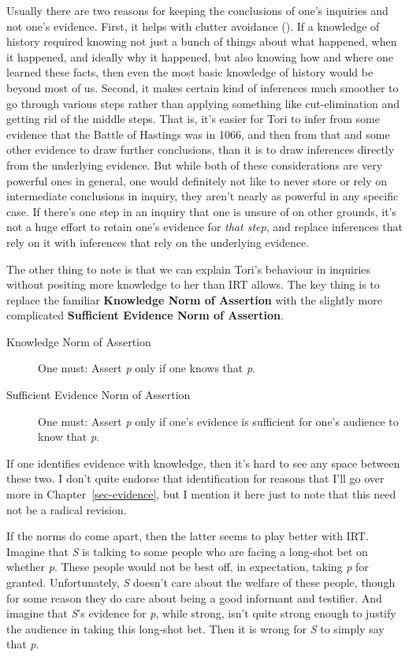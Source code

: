 \documentclass[
  12pt,
  letterpaper,
]{scrbook}
\begin{document}
Usually there are two reasons for keeping the conclusions of one's
inquiries and not one's evidence. First, it helps with clutter avoidance
(). If a knowledge of history
required knowing not just a bunch of things about what happened, when it
happened, and ideally why it happened, but also knowing how and where
one learned these facts, then even the most basic knowledge of history
would be beyond most of us. Second, it makes certain kind of inferences
much smoother to go through various steps rather than applying something
like cut-elimination and getting rid of the middle steps. That is, it's
easier for Tori to infer from some evidence that the Battle of Hastings
was in 1066, and then from that and some other evidence to draw further
conclusions, than it is to draw inferences directly from the underlying
evidence. But while both of these considerations are very powerful ones
in general, one would definitely not like to never store or rely on
intermediate conclusions in inquiry, they aren't nearly as powerful in
any specific case. If there's one step in an inquiry that one is unsure
of on other grounds, it's not a huge effort to retain one's evidence for
\emph{that step}, and replace inferences that rely on it with inferences
that rely on the underlying evidence.

The other thing to note is that we can explain Tori's behaviour in
inquiries without positing more knowledge to her than IRT allows. The
key thing is to replace the familiar \textbf{Knowledge Norm of
Assertion} with the slightly more complicated \textbf{Sufficient
Evidence Norm of Assertion}.

\begin{description}
\item[Knowledge Norm of Assertion]
One must: Assert \emph{p} only if one knows that \emph{p}.
\item[Sufficient Evidence Norm of Assertion]
One must: Assert \emph{p} only if one's evidence is sufficient for one's
audience to know that \emph{p}.
\end{description}

If one identifies evidence with knowledge, then it's hard to see any
space between these two. I don't quite endorse that identification for
reasons that I'll go over more in Chapter~\ref{sec-evidence}, but I
mention it here just to note that this need not be a radical revision.

If the norms do come apart, then the latter seems to play better with
IRT. Imagine that \emph{S} is talking to some people who are facing a
long-shot bet on whether \emph{p}. These people would not be best off,
in expectation, taking \emph{p} for granted. Unfortunately, \emph{S}
doesn't care about the welfare of these people, though for some reason
they do care about being a good informant and testifier. And imagine
that \emph{S}'s evidence for \emph{p}, while strong, isn't quite strong
enough to justify the audience in taking this long-shot bet. Then it is
wrong for \emph{S} to simply say that \emph{p}.
\end{document}

